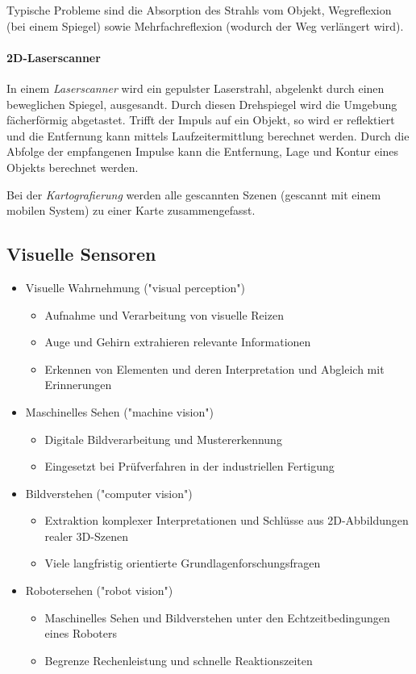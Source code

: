 					Typische Probleme sind die Absorption des Strahls vom Objekt, Wegreflexion (\zB bei einem Spiegel) sowie Mehrfachreflexion (wodurch der Weg verlängert wird).

				\paragraph{2D-Laserscanner}
					In einem \emph{Laserscanner} wird ein gepulster Laserstrahl, abgelenkt durch einen beweglichen Spiegel, ausgesandt. Durch diesen Drehspiegel wird die Umgebung fächerförmig abgetastet. Trifft der Impuls auf ein Objekt, so wird er reflektiert und die Entfernung kann mittels Laufzeitermittlung berechnet werden. Durch die Abfolge der empfangenen Impulse kann die Entfernung, Lage und Kontur eines Objekts berechnet werden.

					Bei der \emph{Kartografierung} werden alle gescannten Szenen (gescannt mit einem mobilen System) zu einer Karte zusammengefasst.

		\subsection{Visuelle Sensoren}
			\begin{itemize}
				\item Visuelle Wahrnehmung ("visual perception")
					\begin{itemize}
						\item Aufnahme und Verarbeitung von visuelle Reizen
						\item Auge und Gehirn extrahieren relevante Informationen
						\item Erkennen von Elementen und deren Interpretation und Abgleich mit Erinnerungen
					\end{itemize}
				\item Maschinelles Sehen ("machine vision")
					\begin{itemize}
						\item Digitale Bildverarbeitung und Mustererkennung
						\item Eingesetzt \zB bei Prüfverfahren in der industriellen Fertigung
					\end{itemize}
				\item Bildverstehen ("computer vision")
					\begin{itemize}
						\item Extraktion komplexer Interpretationen und Schlüsse aus 2D-Abbildungen realer 3D-Szenen
						\item Viele langfristig orientierte Grundlagenforschungsfragen
					\end{itemize}
				\item Robotersehen ("robot vision")
					\begin{itemize}
						\item Maschinelles Sehen und Bildverstehen unter den Echtzeitbedingungen eines Roboters
						\item Begrenze Rechenleistung und schnelle Reaktionszeiten
					\end{itemize}
			\end{itemize}

